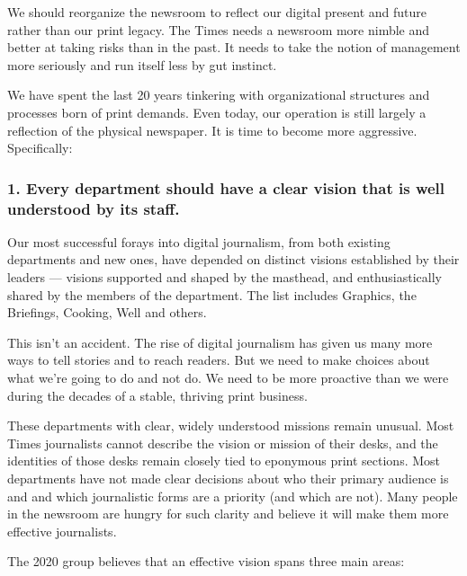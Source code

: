 We should reorganize the newsroom to reflect our digital present and
future rather than our print legacy. The Times needs a newsroom more
nimble and better at taking risks than in the past. It needs to take the
notion of management more seriously and run itself less by gut instinct.

We have spent the last 20 years tinkering with organizational structures
and processes born of print demands. Even today, our operation is still
largely a reflection of the physical newspaper. It is time to become
more aggressive. Specifically:

\hypertarget{1-every-department-should-have-a-clear-vision-that-is-well-understood-by-its-staff}{%
\subsubsection{1. Every department should have a clear vision that is
well understood by its
staff.}\label{1-every-department-should-have-a-clear-vision-that-is-well-understood-by-its-staff}}

Our most successful forays into digital journalism, from both existing
departments and new ones, have depended on distinct visions established
by their leaders --- visions supported and shaped by the masthead, and
enthusiastically shared by the members of the department. The list
includes Graphics, the Briefings, Cooking, Well and others.

This isn't an accident. The rise of digital journalism has given us many
more ways to tell stories and to reach readers. But we need to make
choices about what we're going to do and not do. We need to be more
proactive than we were during the decades of a stable, thriving print
business.

These departments with clear, widely understood missions remain unusual.
Most Times journalists cannot describe the vision or mission of their
desks, and the identities of those desks remain closely tied to
eponymous print sections. Most departments have not made clear decisions
about who their primary audience is and and which journalistic forms are
a priority (and which are not). Many people in the newsroom are hungry
for such clarity and believe it will make them more effective
journalists.

The 2020 group believes that an effective vision spans three main areas:

